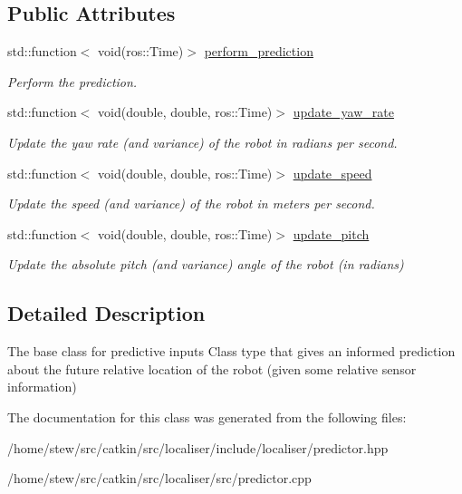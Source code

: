 \subsection*{Public Attributes}
\begin{DoxyCompactItemize}
\item 
\mbox{\label{classPredictor_a068ceee33f66ecad531408cc499efa9d}} 
std\+::function$<$ void(ros\+::\+Time)$>$ \hyperlink{classPredictor_a068ceee33f66ecad531408cc499efa9d}{perform\+\_\+prediction}
\begin{DoxyCompactList}\small\item\em Perform the prediction. \end{DoxyCompactList}\item 
\mbox{\label{classPredictor_a30bdde13b4f9510fc93d7ec878d2ccd4}} 
std\+::function$<$ void(double, double, ros\+::\+Time)$>$ \hyperlink{classPredictor_a30bdde13b4f9510fc93d7ec878d2ccd4}{update\+\_\+yaw\+\_\+rate}
\begin{DoxyCompactList}\small\item\em Update the yaw rate (and variance) of the robot in radians per second. \end{DoxyCompactList}\item 
\mbox{\label{classPredictor_a4cb933efbb1a623cc8983e30cee18e0c}} 
std\+::function$<$ void(double, double, ros\+::\+Time)$>$ \hyperlink{classPredictor_a4cb933efbb1a623cc8983e30cee18e0c}{update\+\_\+speed}
\begin{DoxyCompactList}\small\item\em Update the speed (and variance) of the robot in meters per second. \end{DoxyCompactList}\item 
\mbox{\label{classPredictor_a71c837f66a7964d532474020b899c61c}} 
std\+::function$<$ void(double, double, ros\+::\+Time)$>$ \hyperlink{classPredictor_a71c837f66a7964d532474020b899c61c}{update\+\_\+pitch}
\begin{DoxyCompactList}\small\item\em Update the absolute pitch (and variance) angle of the robot (in radians) \end{DoxyCompactList}\end{DoxyCompactItemize}


\subsection{Detailed Description}
The base class for predictive inputs Class type that gives an informed prediction about the future relative location of the robot (given some relative sensor information) 

The documentation for this class was generated from the following files\+:\begin{DoxyCompactItemize}
\item 
/home/stew/src/catkin/src/localiser/include/localiser/predictor.\+hpp\item 
/home/stew/src/catkin/src/localiser/src/predictor.\+cpp\end{DoxyCompactItemize}
